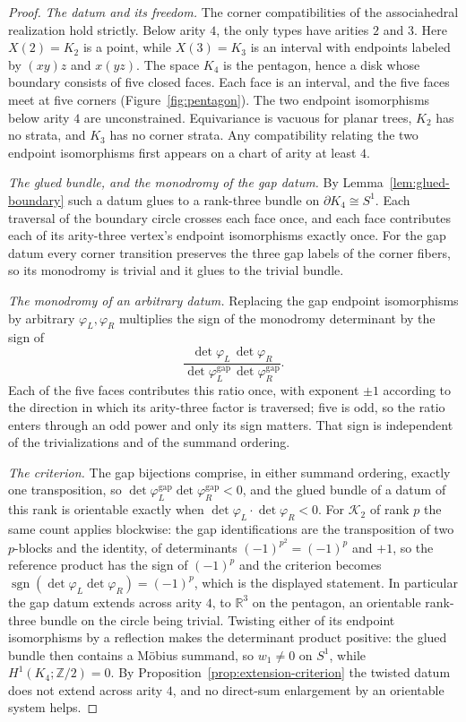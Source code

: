 \documentclass[11pt,letterpaper,twoside]{article}
\theoremstyle{plain}
\theoremstyle{definition}
\theoremstyle{remark}
\begin{document}
\begin{proof}
\emph{The datum and its freedom.}  The corner compatibilities of the associahedral realization hold strictly.  Below arity \(4\), the only types have arities \(2\) and \(3\).  Here \(X(2)=K_2\) is a point, while \(X(3)=K_3\) is an interval with endpoints labeled by \((xy)z\) and \(x(yz)\).  The space \(K_4\) is the pentagon, hence a disk whose boundary consists of five closed faces.  Each face is an interval, and the five faces meet at five corners (Figure~\ref{fig:pentagon}).  The two endpoint isomorphisms below arity \(4\) are unconstrained.  Equivariance is vacuous for planar trees, \(K_2\) has no strata, and \(K_3\) has no corner strata.  Any compatibility relating the two endpoint isomorphisms first appears on a chart of arity at least \(4\).

\emph{The glued bundle, and the monodromy of the gap datum.}  By Lemma~\ref{lem:glued-boundary} such a datum glues to a rank-three bundle on \(\partial K_4\cong S^1\).  Each traversal of the boundary circle crosses each face once, and each face contributes each of its arity-three vertex's endpoint isomorphisms exactly once.  For the gap datum every corner transition preserves the three gap labels of the corner fibers, so its monodromy is trivial and it glues to the trivial bundle.

\emph{The monodromy of an arbitrary datum.}  Replacing the gap endpoint isomorphisms by arbitrary \(\varphi_L,\varphi_R\) multiplies the sign of the monodromy determinant by the sign of
\[
 \frac{\det\varphi_L\,\det\varphi_R}
      {\det\varphi^{\mathrm{gap}}_L\,\det\varphi^{\mathrm{gap}}_R}.
\]
Each of the five faces contributes this ratio once, with exponent \(\pm1\) according to the direction in which its arity-three factor is traversed; five is odd, so the ratio enters through an odd power and only its sign matters.  That sign is independent of the trivializations and of the summand ordering.

\emph{The criterion.}  The gap bijections comprise, in either summand ordering, exactly one transposition, so \(\det\varphi^{\mathrm{gap}}_L\det\varphi^{\mathrm{gap}}_R<0\), and the glued bundle of a datum of this rank is orientable exactly when \(\det\varphi_L\cdot\det\varphi_R<0\).  For \(\mathcal K_2\) of rank \(p\) the same count applies blockwise: the gap identifications are the transposition of two \(p\)-blocks and the identity, of determinants \((-1)^{p^2}=(-1)^p\) and \(+1\), so the reference product has the sign of \((-1)^p\) and the criterion becomes \(\operatorname{sgn}(\det\varphi_L\det\varphi_R)=(-1)^p\), which is the displayed statement.  In particular the gap datum extends across arity \(4\), to \(\mathbb R^{3}\) on the pentagon, an orientable rank-three bundle on the circle being trivial.  Twisting either of its endpoint isomorphisms by a reflection makes the determinant product positive: the glued bundle then contains a M\"obius summand, so \(w_1\neq0\) on \(S^1\), while \(H^1(K_4;\mathbb Z/2)=0\).  By Proposition~\ref{prop:extension-criterion} the twisted datum does not extend across arity \(4\), and no direct-sum enlargement by an orientable system helps.
\end{proof}
\end{document}
